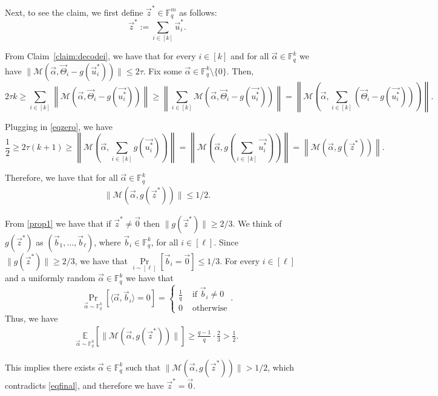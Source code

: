 \documentclass[10pt,a4paper]{article}
\newcommand{\F}{\mathbb{F}}
\renewcommand{\ge}{ \geqslant}
\renewcommand{\le}{ \leqslant}
\renewcommand{\kappa}{\tau}
\newcommand{\M}{\mathcal{M}}
\begin{document}
Next, to see the claim, we first define $\vec{z}^\ast\in \F_q^m$ as follows:
$$
\vec{z}^\ast:=\sum_{i\in[k]}\vec{u}_i^\ast.
$$


From Claim~\ref{claim:decodei}, we have that for every $i\in[k]$ and for all $\vec{\alpha}\in \F_q^k$ we have $\|\M(\vec{\alpha},\vec{\Theta}_i-g(\vec{u}_i^\ast))\|\le 2\kappa$.  
Fix some $\vec{\alpha}\in \F_q^k\setminus \{0\}$. Then,
$$2\kappa k\ge   \sum_{i\in[k]}\left\|\M(  \vec{\alpha},\vec{\Theta}_i-g(\vec{u_i^\ast})) \right\| \ge \left\|\sum_{i\in[k]}\M(  \vec{\alpha},\vec{\Theta}_i-g(\vec{u_i^\ast})) \right\|=\left\|\M\left(  \vec{\alpha},\sum_{i\in[k]}\left(\vec{\Theta}_i-g(\vec{u_i^\ast})\right)\right) \right\|.$$ 
 
Plugging in \eqref{eqzero}, we have
$$\frac{1}{2}\ge 2\kappa (k+1)\ge \left\|\M\left(  \vec{\alpha},\sum_{i\in[k]}g(\vec{u_i^\ast})\right) \right\|=\left\|\M\left(  \vec{\alpha},g\left(\sum_{i\in[k]}\vec{u_i^\ast}\right)\right) \right\|=\left\|\M\left(  \vec{\alpha},g\left(\vec{z}^\ast\right)\right) \right\|.$$

Therefore, we have that for all $\vec{\alpha}\in\F_q^k$
\begin{align}
\|\M\left(  \vec{\alpha},g\left(\vec{z}^\ast\right)\right)\|\le1/2.\label{eqfinal}
\end{align}

From \eqref{prop1} we have that if $\vec{z}^\ast\neq \vec{0}$ then  $\|g(\vec{z}^\ast)\|\ge 2/3$.
We think of $g(\vec{z}^\ast)$ as $(\vec{b}_1,\ldots, \vec{b}_{\ell})$, where $\vec{b}_i\in\F_q^k$, for all $i\in[\ell]$. Since $\|g(\vec{z}^\ast)\|\ge 2/3$, we have that $\underset{i\sim [\ell]}{\Pr}[\vec{b}_i=\vec{0}]\le 1/3$. For every $i\in[\ell]$ and a uniformly random $\vec{\alpha}\in\F_q^k$ we have that  $$\Pr_{\vec{\alpha}\sim\F_q^k}[\langle \vec{\alpha},\vec{b}_i\rangle=0]=\begin{cases}
\frac{1}{q}&\text{ if }\vec{b}_i\neq 0\\
0&\text{ otherwise}\end{cases} .$$
 Thus, we have
\begin{align*} \underset{\vec{\alpha}\sim\F_q^k}{\mathbb{E}}\left[\|\M(\vec{\alpha},g(\vec{z}^\ast))\|\right]\ge \frac{q-1}{q}\cdot \frac{2}{3}>\frac{1}{2}. 
\end{align*}

This implies there exists $ \vec{\alpha}\in\F_q^k$ such that $\|\M(\vec{\alpha},g\left(\vec{z}^\ast\right))\|>1/2$, which contradicts \eqref{eqfinal}, and therefore we have $\vec{z}^\ast= \vec{0}$.
\end{document}
